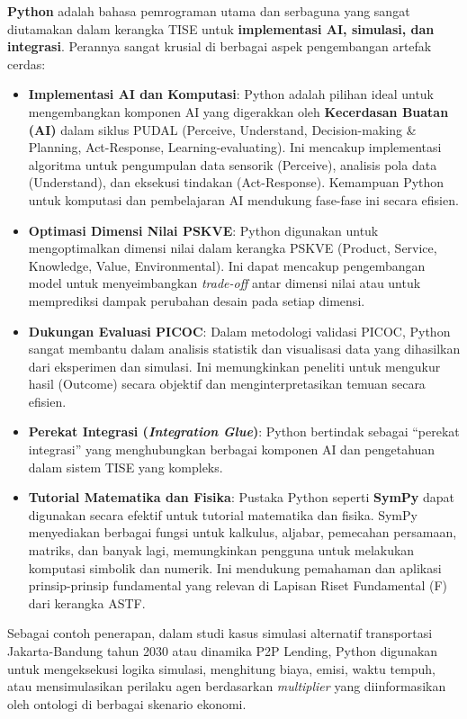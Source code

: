 \documentclass[
  letterpaper,
  DIV=11,
  numbers=noendperiod]{scrreprt}
\providecommand{\tightlist}{%
  \setlength{\itemsep}{0pt}\setlength{\parskip}{0pt}}
\begin{document}
\textbf{Python} adalah bahasa pemrograman utama dan serbaguna yang
sangat diutamakan dalam kerangka TISE untuk \textbf{implementasi AI,
simulasi, dan integrasi}. Perannya sangat krusial di berbagai aspek
pengembangan artefak cerdas:

\begin{itemize}
\tightlist
\item
  \textbf{Implementasi AI dan Komputasi}: Python adalah pilihan ideal
  untuk mengembangkan komponen AI yang digerakkan oleh
  \textbf{Kecerdasan Buatan (AI)} dalam siklus PUDAL (Perceive,
  Understand, Decision-making \& Planning, Act-Response,
  Learning-evaluating). Ini mencakup implementasi algoritma untuk
  pengumpulan data sensorik (Perceive), analisis pola data (Understand),
  dan eksekusi tindakan (Act-Response). Kemampuan Python untuk komputasi
  dan pembelajaran AI mendukung fase-fase ini secara efisien.
\item
  \textbf{Optimasi Dimensi Nilai PSKVE}: Python digunakan untuk
  mengoptimalkan dimensi nilai dalam kerangka PSKVE (Product, Service,
  Knowledge, Value, Environmental). Ini dapat mencakup pengembangan
  model untuk menyeimbangkan \emph{trade-off} antar dimensi nilai atau
  untuk memprediksi dampak perubahan desain pada setiap dimensi.
\item
  \textbf{Dukungan Evaluasi PICOC}: Dalam metodologi validasi PICOC,
  Python sangat membantu dalam analisis statistik dan visualisasi data
  yang dihasilkan dari eksperimen dan simulasi. Ini memungkinkan
  peneliti untuk mengukur hasil (Outcome) secara objektif dan
  menginterpretasikan temuan secara efisien.
\item
  \textbf{Perekat Integrasi (\emph{Integration Glue})}: Python bertindak
  sebagai ``perekat integrasi'' yang menghubungkan berbagai komponen AI
  dan pengetahuan dalam sistem TISE yang kompleks.
\item
  \textbf{Tutorial Matematika dan Fisika}: Pustaka Python seperti
  \textbf{SymPy} dapat digunakan secara efektif untuk tutorial
  matematika dan fisika. SymPy menyediakan berbagai fungsi untuk
  kalkulus, aljabar, pemecahan persamaan, matriks, dan banyak lagi,
  memungkinkan pengguna untuk melakukan komputasi simbolik dan numerik.
  Ini mendukung pemahaman dan aplikasi prinsip-prinsip fundamental yang
  relevan di Lapisan Riset Fundamental (F) dari kerangka ASTF.
\end{itemize}

Sebagai contoh penerapan, dalam studi kasus simulasi alternatif
transportasi Jakarta-Bandung tahun 2030 atau dinamika P2P Lending,
Python digunakan untuk mengeksekusi logika simulasi, menghitung biaya,
emisi, waktu tempuh, atau mensimulasikan perilaku agen berdasarkan
\emph{multiplier} yang diinformasikan oleh ontologi di berbagai skenario
ekonomi.
\end{document}
